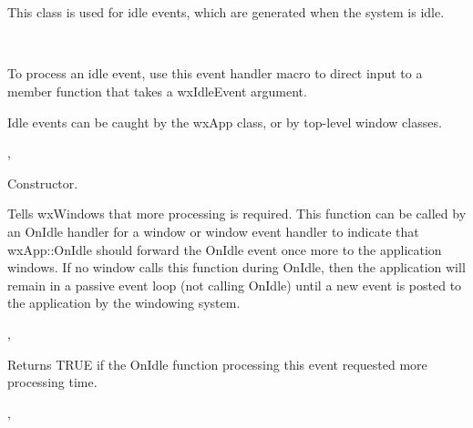 \section{}\label{wxidleevent}

This class is used for idle events, which are generated when the system is idle.


\\


To process an idle event, use this event handler macro to direct input to a member
function that takes a wxIdleEvent argument.

\twocolwidtha{7cm}
\begin{twocollist}\itemsep=0pt
\end{twocollist}%


Idle events can be caught by the wxApp class, or by top-level window classes.


, 




Constructor.

\label{wxidleeventrequestmore}


Tells wxWindows that more processing is required. This function can be called by an OnIdle
handler for a window or window event handler to indicate that wxApp::OnIdle should
forward the OnIdle event once more to the application windows. If no window calls this function
during OnIdle, then the application will remain in a passive event loop (not calling OnIdle) until a
new event is posted to the application by the windowing system.


, 

\label{wxidleeventmorerequested}


Returns TRUE if the OnIdle function processing this event requested more processing time.


, 

